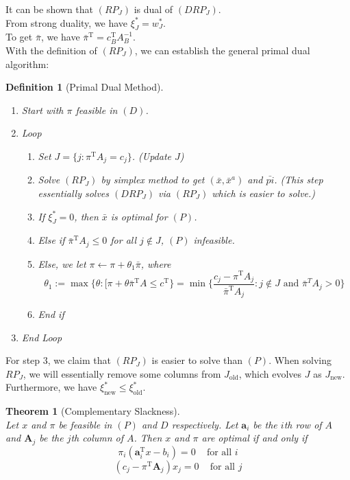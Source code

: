 \documentclass[12pt]{article}
\newcommand{\T}{\mathrm{T}}
\newtheorem{definition}{Definition}[section]
\newtheorem{theorem}{Theorem}[section]
\theoremstyle{definition}
\begin{document}
It can be shown that $(RP_J)$ is dual of $(DRP_J)$.\\
From strong duality, we have $\xi_J^\ast = w_J^\ast$.\\
To get $\bar{\pi}$, we have $\bar{\pi}^\T = c_B^\T A_B^{-1}$.\\
With the definition of $(RP_J)$, we can establish the general primal dual algorithm:\\
\begin{definition}[Primal Dual Method]
\hfill\\\normalfont
\begin{enumerate}
  \item Start with $\pi$ feasible in $(D)$.
  \item Loop
  \begin{enumerate}
    \item Set $J=\{j:\pi^\T A_j=c_j\}$. (Update $J$)
    \item Solve $(RP_J)$ by simplex method to get $(\bar{x}, \bar{x}^a)$ and $\bar{pi}$. (This step essentially solves $(DRP_J)$ via $(RP_J)$ which is easier to solve.)
    \item If $\xi_J^\ast=0$, then $\bar{x}$ is optimal for $(P)$.
    \item Else if $\bar{\pi}^\T A_j\leq 0$ for all $j\not\in J$, $(P)$ infeasible.
    \item Else, we let $\pi\leftarrow \pi+\theta_1\bar{\pi}$, where
    \[
\theta_1:=\max\{\theta:[\pi+\theta\bar{\pi}^\T A\leq c^\T\}=\min\{\frac{c_j-\pi^\T A_j}{\bar{\pi}^\T A_j}: j\not\in J \text{ and } \bar{\pi}^T A_j>0\}
    \]
    \item End if
  \end{enumerate}
  \item End Loop
\end{enumerate}
\end{definition}
For step $3$, we claim that $(RP_J)$ is easier to solve than $(P)$. When solving $RP_J$, we will essentially remove some columns from $J_\text{old}$, which evolves $J$ as $J_\text{new}$. Furthermore, we have $\xi_\text{new}^\ast \leq \xi_\text{old}^\ast$.\\
\begin{theorem}[Complementary Slackness]
\hfill\\\normalfont Let $x$ and $\pi$ be feasible in $(P)$ and $D$ respectively. Let $\mathbf{a}_i$ be the $i$th row of $A$ and $\mathbf{A}_j$ be the $j$th column of $A$. Then $x$ and $\pi$ are optimal if and only if
\[
\pi_i(\mathbf{a}_i^\T x-b_i)=0\;\;\;\text{ for all }i
\]
\[
(c_j-\pi^\T \mathbf{A}_j)x_j=0\;\;\;\text{ for all }j
\]
\end{theorem}
\end{document}
